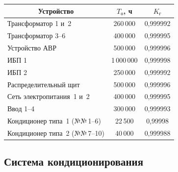 \begin{table}\small %

\begin{center}


\vspace*{2ex}



\tabcolsep=8pt

\begin{tabular}{|l|c|c|}

\hline

\multicolumn{1}{|c|}{Устройство}&$T_{\mathrm{о}}$, ч&$K_{\mathrm{г}}$\\

\hline

Трансформатор 1 и~2&260\,000&0,999992\\

Трансформатор 3--6&400\,000&0,999995\\

Устройство АВР&500\,000&0,999996\\

ИБП 1&1\,000\,000\hphantom{1\,}&0,999998\\

ИБП 2&250\,000&0,999992\\

Распределительный щит&500\,000&0,999996\\

Сеть электропитания~1 и~2&400\,000&0,999995\\

Ввод 1--4&300\,000&0,999993\\

Кондиционер типа~1 (№№\,1--6)&\hphantom{9}22\,500&0,99998\hphantom{9}\\

Кондиционер типа~2 (№№\,7--10)&\hphantom{9}40\,000&0,999988\\

  \hline

  \end{tabular}

  \end{center}

  \vspace*{-9pt}

  \end{table}

  

  \subsection{Система кондиционирования}

